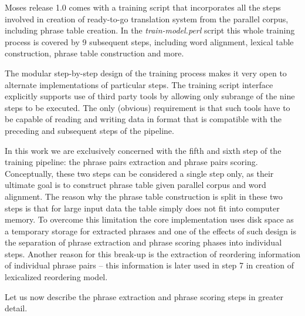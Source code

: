 
Moses release 1.0 comes with a training script that incorporates all the steps
involved in creation of ready-to-go translation system from the parallel corpus,
including phrase table creation.
In the \emph{train-model.perl} script this whole training process is covered by
9 subsequent steps,
including word alignment, lexical table construction, phrase table construction and more.

The modular step-by-step design of the training process makes it very open to
alternate implementations of particular steps.
The training script interface explicitly supports use of third party tools by
allowing only subrange of the nine steps to be executed.
The only (obvious) requirement is that such tools have to be capable of reading and
writing data in format that is compatible with the preceding and subsequent steps
of the pipeline.

In this work we are exclusively concerned with the fifth and sixth step of
the training pipeline:
the phrase pairs extraction
and phrase pairs scoring.
Conceptually, these two steps can be considered a single step only, as their ultimate
goal is to construct phrase table given parallel corpus and word alignment.
The reason why the phrase table construction is split in these two steps is that
for large input data the table simply does not fit into computer memory.
To overcome this limitation the core implementation uses disk space as a temporary storage
for extracted phrases and one of the effects of such design is the separation of
phrase extraction and phrase scoring phases into individual steps.
Another reason for this break-up is the extraction of reordering information
of individual phrase pairs -- this information is later used in step 7 in creation
of lexicalized reordering model.

Let us now describe the phrase extraction and phrase scoring steps in greater detail.


